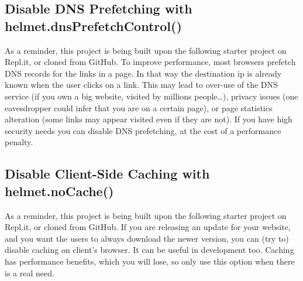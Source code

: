 \documentclass{article}%
\begin{document}
%
\subsection{Disable DNS Prefetching with helmet.dnsPrefetchControl()}%
\label{subsec:DisableDNSPrefetchingwithhelmet.dnsPrefetchControl()}%
As a reminder, this project is being built upon the following starter project on Repl.it, or cloned from GitHub.\newline%
To improve performance, most browsers prefetch DNS records for the links in a page. In that way the destination ip is already known when the user clicks on a link. This may lead to over{-}use of the DNS service (if you own a big website, visited by millions people…), privacy issues (one eavesdropper could infer that you are on a certain page), or page statistics alteration (some links may appear visited even if they are not). If you have high security needs you can disable DNS prefetching, at the cost of a performance penalty.\newline%

%
\subsection{Disable Client{-}Side Caching with helmet.noCache()}%
\label{subsec:DisableClient{-}SideCachingwithhelmet.noCache()}%
As a reminder, this project is being built upon the following starter project on Repl.it, or cloned from GitHub.\newline%
If you are releasing an update for your website, and you want the users to always download the newer version, you can (try to) disable caching on client’s browser. It can be useful in development too. Caching has performance benefits, which you will lose, so only use this option when there is a real need.\newline%

%
\end{document}

